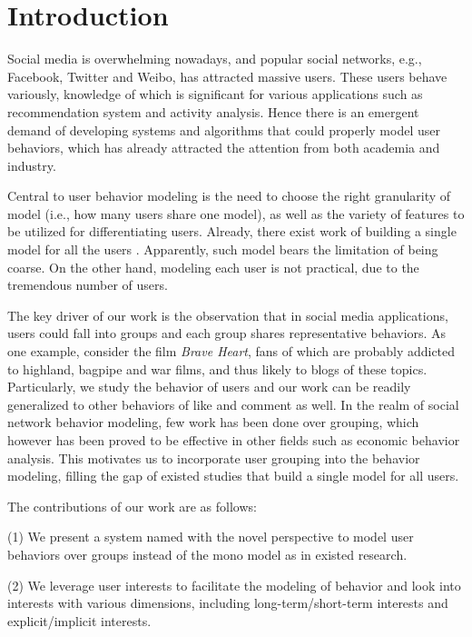 \section{Introduction}
\label{sec:intro}

Social media is overwhelming nowadays, and popular social networks, e.g., Facebook, Twitter and Weibo, has attracted  massive users.
These users behave variously, knowledge of which is significant for various applications such as recommendation system and activity analysis.
Hence there is an emergent demand of developing systems and algorithms that could properly model user behaviors, which has already attracted the attention from both academia and industry.

Central to user behavior modeling is the need to choose the right granularity of model (i.e., how many users share one model), as well as the variety of features to be utilized for differentiating users.
Already, there exist work of building a single model for all the users \cite{IEEEexample:conf/wsdm/FengW13,IEEEexample:conf/ijcai/ZhangLTCL13,IEEEexample:journals/tkdd/ZhangTLLX15}.
Apparently, such model bears the limitation of being coarse.
On the other hand, modeling each user is not practical, due to the tremendous number of users.

The key driver of our work is the observation that in social media applications, users could fall into groups and each group shares representative behaviors.
%
As one example, consider the film \textit{Brave Heart}, fans of which are probably addicted to highland, bagpipe and war films, and thus likely to \ret{} blogs of these topics.
Particularly, we study the \retg{} behavior of users and our work can be readily generalized to other behaviors of like and comment as well.
In the realm of social network behavior modeling, few work has been done over grouping, which however has been proved to be effective in other fields such as economic behavior analysis.
This motivates us to incorporate user grouping into the \retg{} behavior modeling, filling the gap of existed studies that build a single model for all users.

The contributions of our work are as follows:

\stab(1) We present a system named \sys{} with the novel perspective to model user behaviors over groups instead of the mono model as in existed research.

\stab(2) We leverage user interests to facilitate the modeling of \retg{} behavior and look into interests with various dimensions, including long-term/short-term interests and explicit/implicit interests.

